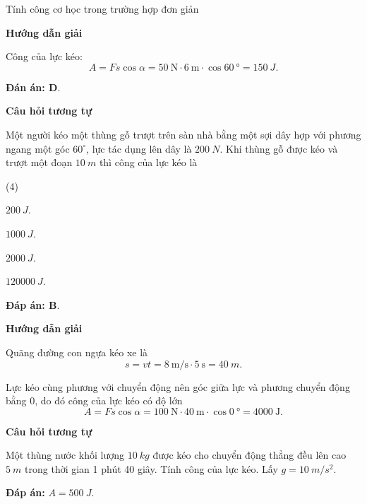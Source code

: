 	\begin{dang}{Tính công cơ học trong trường hợp đơn giản}
		{	\begin{center}
				\textbf{Hướng dẫn giải}
			\end{center}
			Công của lực kéo:
			$$A=Fs\cos \alpha  =\SI{50}{\newton}\cdot\SI{6}{\meter}\cdot\cos\SI{60}{\degree}=\SI{150}{J}.$$
			
			\textbf{Đán án: D}.
			
			\begin{center}
				\textbf{Câu hỏi tương tự}
			\end{center}
			
			Một người kéo một thùng gỗ trượt trên sàn nhà bằng một sợi dây hợp với phương ngang một góc $60^\circ$, lực tác dụng lên dây là $\SI{200}{N}$. Khi thùng gỗ được kéo và trượt một đoạn $\SI{10}{m}$ thì công của lực kéo là
			\begin{mcq}(4)
				\item $\SI{200}{J}$. 
				\item $\SI{1000}{J}$.
				\item $\SI{2000}{J}$.
				\item $\SI{120000}{J}$.
			\end{mcq}
			
			\textbf{Đáp án: B}.
		}
		{	\begin{center}
				\textbf{Hướng dẫn giải}
			\end{center}
			
			Quãng đường con ngựa kéo xe là
			$$s=vt=\SI{8}{\meter/\second}\cdot\SI{5}{\second}=\SI{40}{m}.$$
			
			Lực kéo cùng phương với chuyển động nên góc giữa lực và phương chuyển động bằng 0, do đó công của lực kéo có độ lớn
			$$A=Fs\cos\alpha=\SI{100}{\newton}\cdot\SI{40}{\meter}\cdot\cos\SI{0}{\degree}=\SI{4000}{\joule}.$$
			
			
			\begin{center}
				\textbf{Câu hỏi tương tự}
			\end{center}
			
			Một thùng nước khối lượng $\SI{10}{kg}$ được kéo cho chuyển động thẳng đều lên cao $\SI{5}{m}$ trong thời gian 1 phút 40 giây. Tính công của lực kéo. Lấy $g=\SI{10}{m/s^2}$.
			
			\textbf{Đáp án:} $A=\SI{500}{J}$.
			
			
		}
	\end{dang}
	
